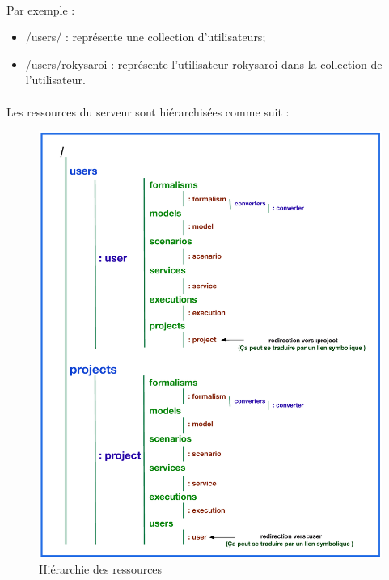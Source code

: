 \documentclass{report}
\begin{document}
\paragraph{}
Par exemple : 

\begin{itemize}
    \item /users/ : représente une collection  d'utilisateurs;
    \item /users/rokysaroi : représente l'utilisateur rokysaroi dans la collection de l'utilisateur.
\end{itemize}

\newpage

\paragraph{}
Les ressources du serveur sont hiérarchisées comme suit :

\begin{figure}[h!]
     \centering
     \includegraphics[scale=0.60] {img/resources_hierarchy.pdf}
     \caption{Hiérarchie des ressources}
\end{figure}
\end{document}
